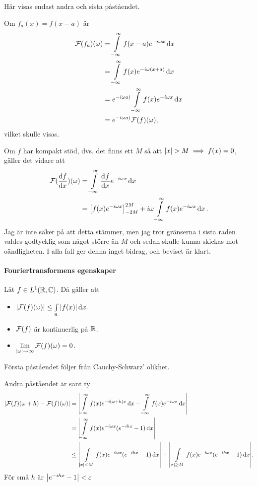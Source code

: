 \proof
Här visas endast andra och sista påståendet.

Om $f_{a}(x) = f(x - a)$ är 
\begin{align*}
	\mathcal{F}(f_{a})(\omega) &= \int\limits_{-\infty}^{\infty}f(x - a)e^{-i\omega x}\dd{x} \\
	                    &= \int\limits_{-\infty}^{\infty}f(x)e^{-i\omega(x + a)}\dd{x} \\
	                    &= e^{-i\omega a)}\int\limits_{-\infty}^{\infty}f(x)e^{-i\omega x}\dd{x} \\
	                    &= e^{-i\omega a)}\mathcal{F}(f)(\omega),
\end{align*}
vilket skulle visas.

Om $f$ har kompakt stöd, dvs. det finns ett $M$ så att $\abs{x} > M\implies f(x) = 0$,  gäller det vidare att
\begin{align*}
	\mathcal{F}(\dv{f}{x})(\omega) &= \int\limits_{-\infty}^{\infty}\dv[]{f}{x} (x)e^{-i\omega x}\dd{x} \\
	                        &= \left[f(x)e^{-i\omega x}\right]_{-2M}^{2M} + i\omega\int\limits_{-\infty}^{\infty}f(x)e^{-i\omega x}\dd{x}.
\end{align*}
Jag är inte säker på att detta stämmer, men jag tror gränserna i sista raden valdes godtycklig som något större än $M$ och sedan skulle kunna skickas mot oändligheten. I alla fall ger denna inget bidrag, och beviset är klart.

\paragraph{Fouriertransformens egenskaper}
Låt $f\in L^{1}(\mathbb{R}, \mathbb{C})$. Då gäller att
\begin{itemize}
	\item $\abs{\mathcal{F}(f)(\omega)} \leq \int\limits_{\mathbb{R}}^{}\abs{f(x)}\dd{x}$.
	\item $\mathcal{F}(f)$ är kontinuerlig på $\mathbb{R}$.
	\item $\lim\limits_{\abs{\omega}\to\infty}\mathcal{F}(f)(\omega) = 0$.
\end{itemize}

\proof
Första påståendet följer från Cauchy-Schwarz' olikhet.

Andra påståendet är sant ty
\begin{align*}
	\abs{\mathcal{F}(f)(\omega + h) - \mathcal{F}(f)(\omega)} &= \abs{\int\limits_{-\infty}^{\infty}f(x)e^{-i(\omega + h)x}\dd{x} - \int\limits_{-\infty}^{\infty}f(x)e^{-i\omega x}\dd{x}} \\
	                                            &= \abs{\int\limits_{-\infty}^{\infty}f(x)e^{-i\omega x}(e^{-ihx} - 1)\dd{x}} \\
	                                            &\leq \abs{\int\limits_{\abs{x} < M}^{}f(x)e^{-i\omega x}(e^{-ihx} - 1)\dd{x}} + \abs{\int\limits_{\abs{x} \geq M}^{}f(x)e^{-i\omega x}(e^{-ihx} - 1)\dd{x}}.
\end{align*}
För små $h$ är $\abs{e^{-ihx} - 1} < \varepsilon$

